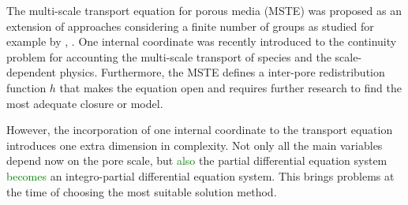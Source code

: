 \documentclass{CFD2011}
\newcommand{\newf}[1]{\textcolor{green}{#1}}
\newcommand{\nof}[1]{\textcolor{cyan}{}}
\begin{document}
The multi-scale transport equation for porous media (MSTE) was proposed as an extension of approaches considering a finite number of groups as studied for example by \cite{Chen1989}, \cite{bouffard2001}. One internal coordinate was recently introduced \citep{DupuySchwarz} to the continuity problem for accounting the multi-scale transport of species and the scale-dependent physics. Furthermore, the MSTE defines a inter-pore redistribution function $h$ that makes the equation open and requires further research to find the most adequate closure or model.

However, the incorporation of one internal coordinate to the transport equation introduces one extra dimension in complexity. Not only all the main variables\nof{,} depend now on the pore scale, but \newf{also }the partial differential equation system \nof{is now}\newf{becomes} an integro-partial differential equation system. This brings problems at the time of choosing the most suitable solution method. 

\nof{Many other phenomena in nature can be described by an integro-differential equation with one or many internal coordinates. The Boltzmann transport equation has the molecule velocity as an internal coordinate. The transport equation applied to neutrons or its condensation into the diffusion equation for neutrons use the neutron energy as internal energy. Population balance problems use the particle, bubble or droplet size as internal coordinate. The least square method has been applied succesfully to population balance problems by cite{Dorao05a}.}

\end{document}
